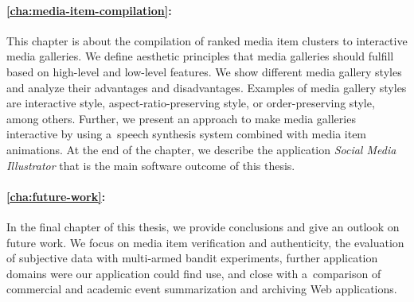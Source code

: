 \paragraph{\autoref{cha:media-item-compilation}:}

This chapter is about the compilation of ranked media item clusters
to interactive media galleries.
We define aesthetic principles that media galleries should fulfill
based on high-level and low-level features.
We show different media gallery styles and analyze their
advantages and disadvantages.
Examples of media gallery styles are interactive style, aspect-ratio-preserving style, or order-preserving style, among others.
Further, we present an approach to make media galleries interactive
by using a~speech synthesis system combined with media item animations.
At the end of the chapter, we describe the application
\emph{Social Media Illustrator} that is
the main software outcome of this thesis.

\paragraph{\autoref{cha:future-work}:}

In the final chapter of this thesis,
we provide conclusions and give an outlook on future work.
We focus on media item verification and authenticity,
the evaluation of subjective data with multi-armed bandit experiments,
further application domains were our application could find use,
and close with a~comparison of commercial and academic event summarization
and archiving Web applications.

\clearpage
\printbibliography[heading=subbibliography]